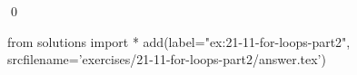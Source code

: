 
\begin{ex}
  \label{ex:21-11-for-loops-part2}
  
  \qed
\end{ex}
\begin{python0}
from solutions import *
add(label="ex:21-11-for-loops-part2",
    srcfilename='exercises/21-11-for-loops-part2/answer.tex')
\end{python0}
